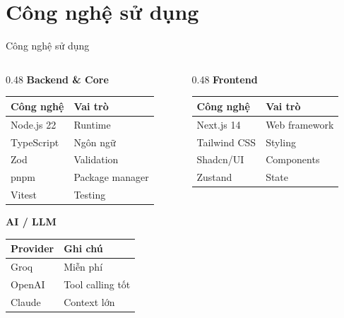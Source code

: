 \documentclass[aspectratio=169,12pt]{beamer}
\begin{document}
\section{Công nghệ sử dụng}

\begin{frame}{Công nghệ sử dụng}
    \begin{columns}[T]
        \begin{column}{0.48\textwidth}
            \textbf{ Backend \& Core}
            \begin{tabular}{ll}
                \toprule
                Công nghệ & Vai trò \\
                \midrule
                Node.js 22 & Runtime \\
                TypeScript & Ngôn ngữ \\
                Zod & Validation \\
                pnpm & Package manager \\
                Vitest & Testing \\
                \bottomrule
            \end{tabular}

            \vspace{0.5cm}

            \textbf{ AI / LLM}
            \begin{tabular}{ll}
                \toprule
                Provider & Ghi chú \\
                \midrule
                Groq & Miễn phí \\
                OpenAI & Tool calling tốt \\
                Claude & Context lớn \\
                \bottomrule
            \end{tabular}
        \end{column}
        \begin{column}{0.48\textwidth}
            \textbf{ Frontend}
            \begin{tabular}{ll}
                \toprule
                Công nghệ & Vai trò \\
                \midrule
                Next.js 14 & Web framework \\
                Tailwind CSS & Styling \\
                Shadcn/UI & Components \\
                Zustand & State \\
                \bottomrule
            \end{tabular}


\end{column}
\end{columns}
\end{frame}
\end{document}
